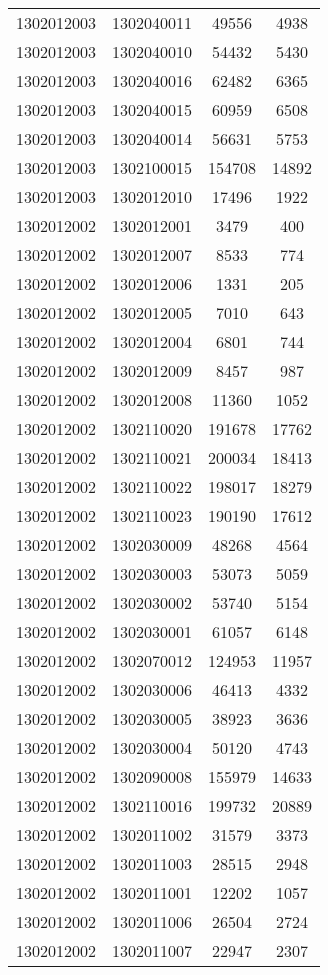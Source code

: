 \begin{longtable}{llcc}
1302012003 & 1302040011 & 49556 & 4938\\
1302012003 & 1302040010 & 54432 & 5430\\
1302012003 & 1302040016 & 62482 & 6365\\
1302012003 & 1302040015 & 60959 & 6508\\
1302012003 & 1302040014 & 56631 & 5753\\
1302012003 & 1302100015 & 154708 & 14892\\
1302012003 & 1302012010 & 17496 & 1922\\
1302012002 & 1302012001 & 3479 & 400\\
1302012002 & 1302012007 & 8533 & 774\\
1302012002 & 1302012006 & 1331 & 205\\
1302012002 & 1302012005 & 7010 & 643\\
1302012002 & 1302012004 & 6801 & 744\\
1302012002 & 1302012009 & 8457 & 987\\
1302012002 & 1302012008 & 11360 & 1052\\
1302012002 & 1302110020 & 191678 & 17762\\
1302012002 & 1302110021 & 200034 & 18413\\
1302012002 & 1302110022 & 198017 & 18279\\
1302012002 & 1302110023 & 190190 & 17612\\
1302012002 & 1302030009 & 48268 & 4564\\
1302012002 & 1302030003 & 53073 & 5059\\
1302012002 & 1302030002 & 53740 & 5154\\
1302012002 & 1302030001 & 61057 & 6148\\
1302012002 & 1302070012 & 124953 & 11957\\
1302012002 & 1302030006 & 46413 & 4332\\
1302012002 & 1302030005 & 38923 & 3636\\
1302012002 & 1302030004 & 50120 & 4743\\
1302012002 & 1302090008 & 155979 & 14633\\
1302012002 & 1302110016 & 199732 & 20889\\
1302012002 & 1302011002 & 31579 & 3373\\
1302012002 & 1302011003 & 28515 & 2948\\
1302012002 & 1302011001 & 12202 & 1057\\
1302012002 & 1302011006 & 26504 & 2724\\
1302012002 & 1302011007 & 22947 & 2307\\

\end{longtable}
